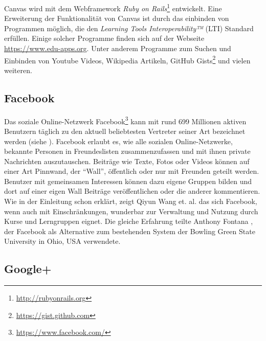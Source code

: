 
Canvas wird mit dem Webframework \emph{Ruby on Rails}\footnote{\url{http://rubyonrails.org}} entwickelt. Eine Erweiterung der Funktionalität von Canvas ist durch das einbinden von Programmen möglich, die den \emph{Learning Tools Interoperability™} (LTI) Standard erfüllen. Einige solcher Programme finden sich auf der Webseite \url{https://www.edu-apps.org}. Unter anderem Programme zum Suchen und Einbinden von Youtube Videos, Wikipedia Artikeln, GitHub Gists\footnote{\url{https://gist.github.com}} und vielen weiteren.


\subsection{Facebook} %
\label{sub:facebook}

Das soziale Online-Netzwerk Facebook\footnote{\url{https://www.facebook.com/}} kann mit rund 699 Millionen aktiven Benutzern täglich zu den aktuell beliebtesten Vertreter seiner Art bezeichnet werden (siehe \cite{Facebook2013}). Facebook erlaubt es, wie alle sozialen Online-Netzwerke, bekannte Personen in Freundeslisten zusammenzufassen und mit ihnen private Nachrichten auszutauschen. Beiträge wie Texte, Fotos oder Videos können auf einer Art Pinnwand, der \enquote{Wall}, öffentlich oder nur mit Freunden geteilt werden. Benutzer mit gemeinsamen Interessen können dazu eigene Gruppen bilden und dort auf einer eigen Wall Beiträge veröffentlichen oder die anderer kommentieren. Wie in der Einleitung schon erklärt, zeigt Qiyun Wang et. al. \cite{Wang2012} das sich Facebook, wenn auch mit Einschränkungen, wunderbar zur Verwaltung und Nutzung durch Kurse und Lerngruppen eignet. Die gleiche Erfahrung teilte Anthony Fontana \cite{Fontana2009,FacebookinEducarion2010}, der Facebook als Alternative zum bestehenden System der Bowling Green State University in Ohio, USA verwendete.


\subsection{Google+} %
\label{sub:google_plus}

